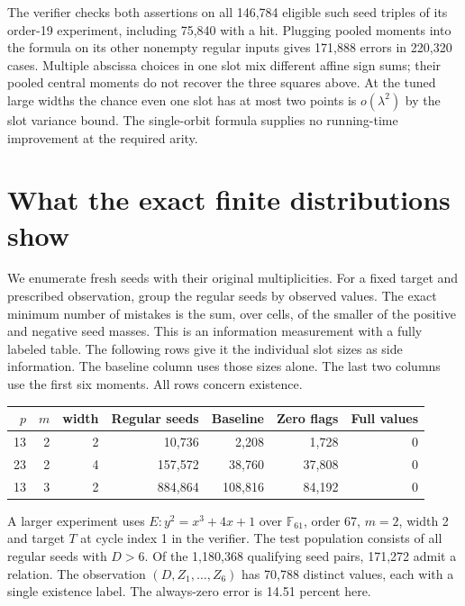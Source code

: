 \documentclass[11pt]{article}
\newcommand{\F}{\mathbb F}
\begin{document}
The verifier checks both assertions on all 146,784 eligible such seed
triples of its order-19 experiment, including 75,840 with a hit. Plugging
pooled moments into the formula on its other nonempty regular inputs
gives 171,888 errors in 220,320 cases. Multiple abscissa choices in
one slot mix different affine sign sums; their pooled central moments
do not recover the three squares above. At the tuned large widths the
chance even one slot has at most two points is $o(\lambda^2)$ by the
slot variance bound. The single-orbit formula supplies no running-time
improvement at the required arity.

\section{What the exact finite distributions show}

We enumerate fresh seeds with their original multiplicities.
For a fixed target and prescribed observation, group the regular seeds
by observed values. The exact minimum number of mistakes is the sum,
over cells, of the smaller of the positive and negative seed masses.
This is an information measurement with a fully labeled table.
The following rows give it the individual slot sizes as side information.
The baseline column uses those sizes alone. The last two columns use
the first six moments. All rows concern existence.

\begin{center}
\begin{tabular}{rrrrrrr}
\toprule
$p$ & $m$ & width & Regular seeds & Baseline & Zero flags & Full values\\
\midrule
13&2&2&10,736&2,208&1,728&0\\
23&2&4&157,572&38,760&37,808&0\\
13&3&2&884,864&108,816&84,192&0\\
\bottomrule
\end{tabular}
\end{center}

A larger experiment uses $E:y^2=x^3+4x+1$ over $\F_{61}$, order 67,
$m=2$, width 2 and target $T$ at cycle index 1 in the verifier. The test
population consists of all regular seeds with $D>6$. Of the 1,180,368
qualifying seed pairs, 171,272 admit a relation. The observation
$(D,Z_1,\ldots,Z_6)$ has 70,788 distinct values, each with a single
existence label. The always-zero error is 14.51 percent here.
\end{document}
